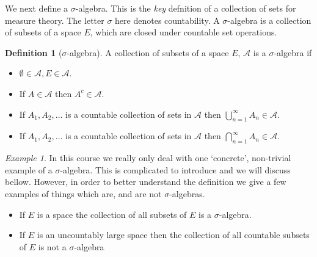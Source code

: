 \documentclass[11pt]{article}
\theoremstyle{definition}
\newtheorem{dfn}[thm]{Definition}
\theoremstyle{remark}
\newtheorem{ex}[thm]{Example}
\begin{document}
We next define a $\sigma$-algebra. This is the \emph{key} defnition of a collection of sets for measure theory. The letter $\sigma$ here denotes countability. A $\sigma$-algebra is a collection of subsets of a space $E$, which are closed under countable set operations.
\begin{dfn}[$\sigma$-algebra]
A collection of subsets of a space $E$, $\mathcal{A}$ is a $\sigma$-algebra if
\begin{itemize}
\item $\emptyset \in \mathcal{A}, E \in \mathcal{A}$.
\item If $A \in \mathcal{A}$ then $A^c \in \mathcal{A}$.
\item If $A_1, A_2, \dots$ is a countable collection of sets in $\mathcal{A}$ then $ \bigcup_{n=1}^\infty A_n \in \mathcal{A}$.
\item If $A_1, A_2, \dots$ is a countable collection of sets in $\mathcal{A}$ then $\bigcap_{n=1}^\infty A_n \in \mathcal{A}$.
\end{itemize}
\end{dfn}


\begin{ex}
In this course we really only deal with one `concrete', non-trivial example of a $\sigma$-algebra. This is complicated to introduce and we will discuss bellow. However, in order to better understand the definition we give a few examples of things which are, and are not $\sigma$-algebras. 
\begin{itemize}
\item If $E$ is a space the collection of all subsets of $E$ is a $\sigma$-algebra.
\item If $E$ is an uncountably large space then the collection of all countable subsets of $E$ is not a $\sigma$-algebra
\end{itemize}
\end{ex}
\end{document}
